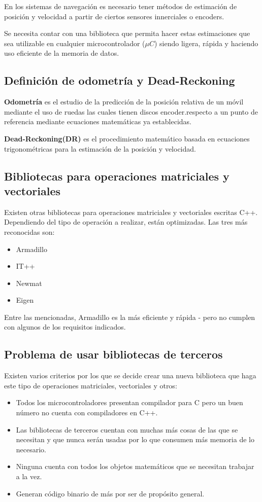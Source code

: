 \documentclass[main.tex]{subfiles}
\begin{document}

En los sistemas de navegación es necesario tener métodos
de estimación de posición y velocidad a partir de ciertos
sensores innerciales o encoders.

Se necesita contar con una biblioteca que permita hacer estas
estimaciones que sea utilizable en cualquier microcontrolador
(${\mu}C$) siendo ligera, rápida y haciendo uso eficiente de la
memoria de datos.

\subsection{Definición de odometría y Dead-Reckoning}
\textbf{Odometría} es el estudio de la predicción de la posición
relativa de un móvil mediante el uso de ruedas las cuales
tienen discos encoder.respecto a un punto de referencia mediante
ecuaciones matemáticas ya establecidas.

\textbf{Dead-Reckoning(DR)} es el procedimiento matemático basada
en ecuaciones trigonométricas para la estimación de la posición
y velocidad.

\subsection{Bibliotecas para operaciones matriciales y vectoriales}
Existen otras bibliotecas para operaciones matriciales y vectoriales
escritas C++. Dependiendo del tipo de operación a realizar, están
optimizadas. Las tres más reconocidas son:

\begin{itemize}
\item Armadillo
\item IT++
\item Newmat
\item Eigen
\end{itemize}

Entre las mencionadas, Armadillo es la más eficiente y rápida
\cite{LibSpeedweb:Armadillo}-\cite{LibCompare} pero no cumplen
con algunos de los requisitos indicados.

\subsection{Problema de usar bibliotecas de terceros}
Existen varios criterios por los que se decide crear una nueva
biblioteca que haga este tipo de operaciones matriciales,
vectoriales y otros:

\begin{itemize}
\item Todos los microcontroladores presentan compilador para C
      pero un buen número no cuenta con compiladores en C++.
\item Las bibliotecas de terceros cuentan con muchas más cosas
      de las que se necesitan y que nunca serán usadas por lo
      que consumen más memoria de lo necesario.
\item Ninguna cuenta con todos los objetos matemáticos que se
      necesitan trabajar a la vez.
\item Generan código binario de más por ser de propósito general.
\end{itemize}
\end{document}
